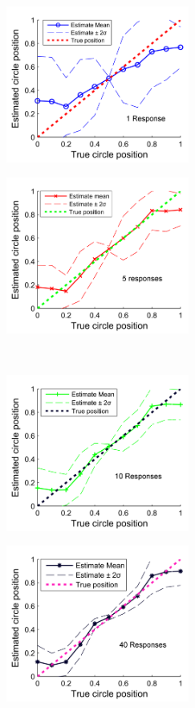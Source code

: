\begin{figure}
\centering
\begin{subfigure}{6cm}
\includegraphics[width=6cm]{line_mc_1res_estimate.png}
\caption{}
\label{Figure: response_estimate_1}
\end{subfigure}
\begin{subfigure}{6cm}
\includegraphics[width=6cm]{line_mc_5res_estimate.png}
\caption{}
\label{Figure: response_estimate_5}
\end{subfigure}\\
\begin{subfigure}{6cm}
\includegraphics[width=6cm]{line_mc_10res_estimate.png}
\caption{}
\label{Figure: response_estimate_10}
\end{subfigure}
\begin{subfigure}{6cm}
\includegraphics[width=6cm]{line_mc_40res_estimate.png}

\end{subfigure}
\end{figure}
